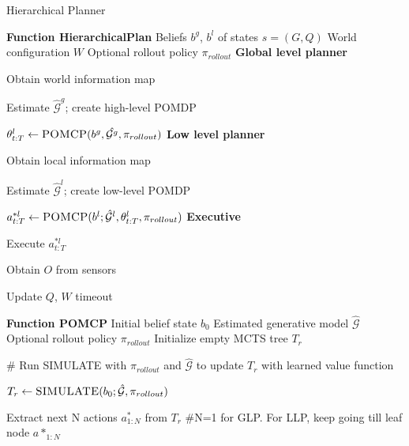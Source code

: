 
\begin{algorithm}[t!]
\caption{Hierarchical Planner}
\label{alg:hierarchicalPlanner}
\begin{multicols}{2}
\begin{algorithmic}
\STATE \textbf{Function HierarchicalPlan}
\REQUIRE Beliefs $b^g$, $b^l$ of states $s=(G, Q)$
\REQUIRE World configuration $W$
\STATE Optional rollout policy $\pi_{rollout}$
\REPEAT
    \STATE \textbf{Global level planner}
    \item  Obtain world information map
    \item Estimate $\hat{\mathcal{G}}^g$; create high-level POMDP
    \item $\theta^l_{t:T} \gets \textsc{POMCP}(b^g, \hat{\mathcal{G}^g}, \pi_{rollout})$
    \STATE \textbf{Low level planner}
    \item Obtain local information map
    \item Estimate $\hat{\mathcal{G}}^l$; create low-level POMDP
    \item $a_{t:T}^{*l} \gets \textsc{POMCP}(b^l;\hat{\mathcal{G}}^l, \theta^l_{t:T}, \pi_{rollout})$ 
    \STATE \textbf{Executive}
    \item Execute $a_{t:T}^{*l}$
    \item Obtain $O$ from sensors
    \item Update $Q$, $W$
\UNTIL timeout
\end{algorithmic}

\begin{algorithmic}
\STATE \textbf{Function POMCP}
\REQUIRE Initial belief state $b_0$
\REQUIRE Estimated generative model $\hat{\mathcal{G}}$
\STATE Optional rollout policy $\pi_{rollout}$
\STATE
\STATE Initialize empty MCTS tree $T_r$
\REPEAT
    \item \# Run SIMULATE with $\pi_{rollout}$ and $\hat{\mathcal{G}}$ to update $T_r$ with learned value function
    \item $T_r \gets \textsc{SIMULATE}(b_0; \hat{\mathcal{G}}, \pi_{rollout})$
\item 
\item Extract next N actions $a^*_{1:N}$ from $T_r$ \#N=1 for GLP. For LLP, keep going till leaf node
\STATE
\RETURN $a*_{1:N}$
\STATE {}


\end{algorithmic}
\end{multicols}
\end{algorithm}
